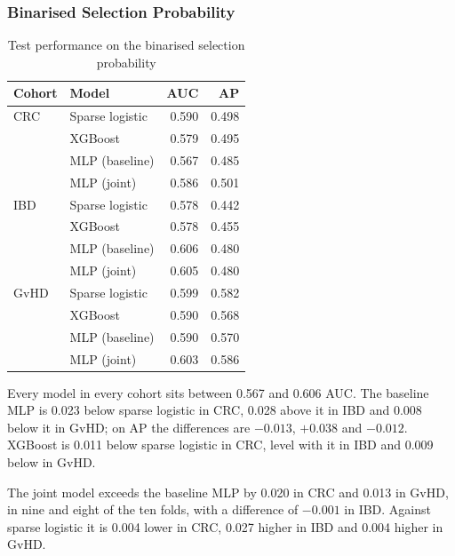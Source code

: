 \subsubsection{Binarised Selection Probability}
\label{res:main-wclass}

\begin{table}[htbp]
  \centering
  \caption{Test performance on the binarised selection probability}
  \label{tab:perf-wclass}
  \begin{tabular}{llrr}
    \hline
    Cohort & Model                     & AUC   & AP    \\
    \hline
    CRC    & Sparse logistic           & 0.590 & 0.498 \\
           & XGBoost                   & 0.579 & 0.495 \\
           & MLP (baseline)            & 0.567 & 0.485 \\
           & MLP (joint)               & 0.586 & 0.501 \\
    \hline
    IBD    & Sparse logistic           & 0.578 & 0.442 \\
           & XGBoost                   & 0.578 & 0.455 \\
           & MLP (baseline)            & 0.606 & 0.480 \\
           & MLP (joint)               & 0.605 & 0.480 \\
    \hline
    GvHD   & Sparse logistic           & 0.599 & 0.582 \\
           & XGBoost                   & 0.590 & 0.568 \\
           & MLP (baseline)            & 0.590 & 0.570 \\
           & MLP (joint)               & 0.603 & 0.586 \\
    \hline
  \end{tabular}
\end{table}

Every model in every cohort sits between 0.567 and 0.606 AUC. The baseline MLP is 0.023 below sparse
logistic in CRC, 0.028 above it in IBD and 0.008 below it in GvHD; on AP the differences are $-0.013$,
$+0.038$ and $-0.012$. XGBoost is 0.011 below sparse logistic in CRC, level with it in IBD and 0.009 below
in GvHD.

The joint model exceeds the baseline MLP by 0.020 in CRC and 0.013 in GvHD, in nine and eight of the ten
folds, with a difference of $-0.001$ in IBD. Against sparse logistic it is 0.004 lower in CRC, 0.027
higher in IBD and 0.004 higher in GvHD.

